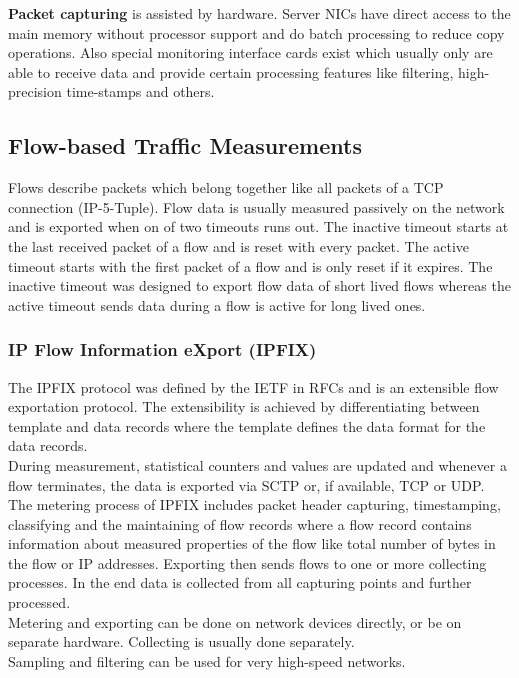 \textbf{Packet capturing} is assisted by hardware.
Server NICs have direct access to the main memory without processor support and do batch processing to reduce copy operations.
Also special monitoring interface cards exist which usually only are able to receive data and provide certain processing features like filtering, high-precision time-stamps and others.

\subsection*{Flow-based Traffic Measurements}
Flows describe packets which belong together like all packets of a TCP connection (IP-5-Tuple).
Flow data is usually measured passively on the network and is exported when on of two timeouts runs out.
The inactive timeout starts at the last received packet of a flow and is reset with every packet.
The active timeout starts with the first packet of a flow and is only reset if it expires.
The inactive timeout was designed to export flow data of short lived flows whereas the active timeout sends data during a flow is active for long lived ones.

\subsubsection*{IP Flow Information eXport (IPFIX)}
The IPFIX protocol was defined by the IETF in RFCs and is an extensible flow exportation protocol.
The extensibility is achieved by differentiating between template and data records where the template defines the data format for the data records.\\
During measurement, statistical counters and values are updated and whenever a flow terminates, the data is exported via SCTP or, if available, TCP or UDP.\\
The metering process of IPFIX includes packet header capturing, timestamping, classifying and the maintaining of flow records where a flow record contains information about measured properties of the flow like total number of bytes in the flow or IP addresses.
Exporting then sends flows to one or more collecting processes.
In the end data is collected from all capturing points and further processed.\\
Metering and exporting can be done on network devices directly, or be on separate hardware.
Collecting is usually done separately.\\
Sampling and filtering can be used for very high-speed networks.

